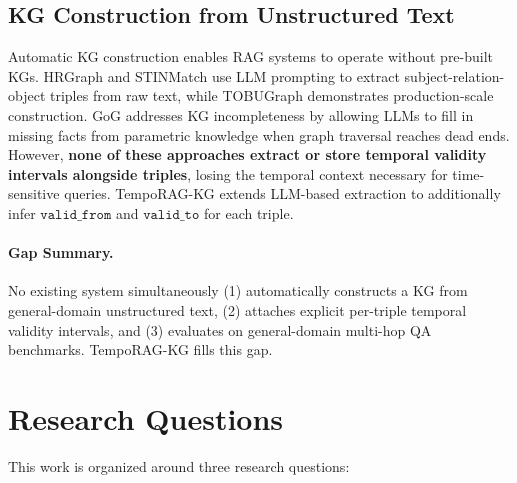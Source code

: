 \documentclass[11pt]{article}
\begin{document}
\subsection{KG Construction from Unstructured Text}

Automatic KG construction enables RAG systems to operate without pre-built
KGs. HRGraph \cite{hrgraph2024} and STINMatch \cite{stinmatch2023} use LLM
prompting to extract subject-relation-object triples from raw text, while
TOBUGraph \cite{tobugraph2024} demonstrates production-scale construction.
GoG \cite{he2024gog} addresses KG incompleteness by allowing LLMs to fill
in missing facts from parametric knowledge when graph traversal reaches
dead ends. However, \textbf{none of these approaches extract or store
temporal validity intervals alongside triples}, losing the temporal context
necessary for time-sensitive queries. TempoRAG-KG extends LLM-based
extraction to additionally infer $\mathtt{valid\_from}$ and
$\mathtt{valid\_to}$ for each triple.

\paragraph{Gap Summary.}
No existing system simultaneously (1) automatically constructs a KG from
general-domain unstructured text, (2) attaches explicit per-triple temporal
validity intervals, and (3) evaluates on general-domain multi-hop QA
benchmarks. TempoRAG-KG fills this gap.

\section{Research Questions}

This work is organized around three research questions:
\end{document}

